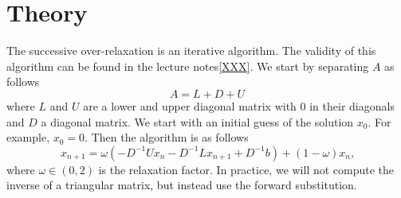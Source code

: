 \section{Theory}

The successive over-relaxation is an iterative algorithm. The validity of this algorithm can be found in the lecture notes\ref{XXX}. We start by separating \(A\) as follows
\[
    A = L + D + U
\]
where \(L\) and \(U\) are a lower and upper diagonal matrix with \(0\) in their diagonals and \(D\) a diagonal matrix. We start with an initial guess of the solution \(x_0\). For example, \(x_0 = 0\). Then the algorithm is as follows
\[
    x_{n + 1} = \omega (-D^{-1} U x_n - D^{-1}L x_{n + 1} + D^{-1} b) + (1 - \omega) x_n \text{,}
\]
where \(\omega \in (0, 2)\) is the relaxation factor. In practice, we will not compute the inverse of a triangular matrix, but instead use the forward substitution.